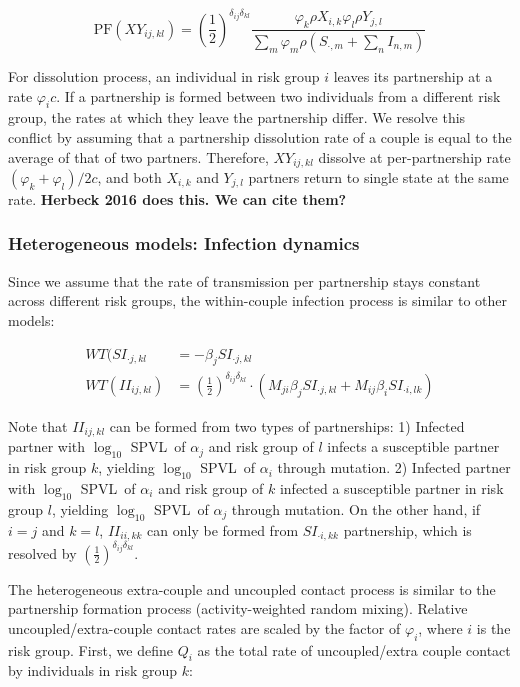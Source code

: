 \documentclass[10pt,letterpaper]{article}
\newcommand{\kkhalf}{\left(\frac{1}{2}\right)^{\delta_{ij} \delta_{kl}}}  %
\newcommand{\Lspvl}{$\log_{10}$ SPVL}
\newcommand{\PF}{\textrm{PF}}
\newcommand{\todo}[1]{\textbf{#1}}
\begin{document}
\begin{equation}
\PF(XY_{ij, kl}) = \kkhalf \frac{\varphi_k \rho X_{i,k} \varphi_l \rho Y_{j, l}}{\sum\limits_m \varphi_m \rho (S_{\cdot, m} + \sum\limits_n I_{n,m})}
\end{equation}

For dissolution process, an individual in risk group $i$ leaves its partnership at a rate $\varphi_i c$. If a partnership is formed between two individuals from a different risk group, the rates at which they leave the partnership differ. We resolve this conflict by assuming that a partnership dissolution rate of a couple is equal to the average of that of two partners. Therefore, $XY_{ij, kl}$ dissolve at per-partnership rate $(\varphi_k + \varphi_l)/2 c$, and both $X_{i,k}$ and $Y_{j,l}$ partners return to single state at the same rate. \todo{Herbeck 2016 does this. We can cite them?}

\subsubsection*{Heterogeneous models: Infection dynamics}

Since we assume that the rate of transmission per partnership stays constant across different risk groups, the within-couple infection process is similar to other models:

\begin{equation}
\begin{aligned}
WT(SI_{\cdot j, kl} &= - \beta_j SI_{\cdot j, kl}\\
WT(II_{ij, kl}) &= \kkhalf \cdot (M_{ji} \beta_j SI_{\cdot j, kl} + M_{ij} \beta_i SI_{\cdot i, lk})
\end{aligned}
\end{equation}

Note that $II_{ij,kl}$ can be formed from two types of partnerships: 1) Infected partner with \Lspvl\ of $\alpha_j$ and risk group of $l$ infects a susceptible partner in risk group $k$, yielding \Lspvl\ of $\alpha_i$ through mutation. 2) Infected partner with \Lspvl\ of $\alpha_i$ and risk group of $k$ infected a susceptible partner in risk group $l$, yielding \Lspvl\ of $\alpha_j$ through mutation. On the other hand, if $i = j$ and $k = l$, $II_{ii,kk}$ can only be formed from $SI_{\cdot i, kk}$ partnership, which is resolved by $\kkhalf$.

The heterogeneous extra-couple and uncoupled contact process is similar to the partnership formation process (activity-weighted random mixing). Relative uncoupled/extra-couple contact rates are scaled by the factor of $\varphi_i$, where $i$ is the risk group. First, we define $Q_{i}$ as the total rate of uncoupled/extra couple contact by individuals in risk group $k$:
\end{document}
